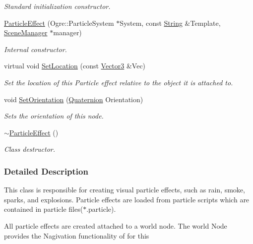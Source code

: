 \begin{DoxyCompactItemize}
\begin{DoxyCompactList}\small\item\em Standard initialization constructor. \item\end{DoxyCompactList}\item 
\hyperlink{classphys_1_1ParticleEffect_aaf5a40f8c22ca3cd01f0feeb08b8308b}{ParticleEffect} (Ogre::ParticleSystem $\ast$System, const \hyperlink{namespacephys_aa03900411993de7fbfec4789bc1d392e}{String} \&Template, \hyperlink{classphys_1_1SceneManager}{SceneManager} $\ast$manager)
\begin{DoxyCompactList}\small\item\em Internal constructor. \item\end{DoxyCompactList}\item 
virtual void \hyperlink{classphys_1_1ParticleEffect_a4371533c2d1d533208b7bc8a067a67e5}{SetLocation} (const \hyperlink{classphys_1_1Vector3}{Vector3} \&Vec)
\begin{DoxyCompactList}\small\item\em Set the location of this Particle effect relative to the object it is attached to. \item\end{DoxyCompactList}\item 
void \hyperlink{classphys_1_1ParticleEffect_aab98a28c2a7984fca81cdfee5e1d2086}{SetOrientation} (\hyperlink{classphys_1_1Quaternion}{Quaternion} Orientation)
\begin{DoxyCompactList}\small\item\em Sets the orientation of this node. \item\end{DoxyCompactList}\item 
\hypertarget{classphys_1_1ParticleEffect_a8c9c3d0cd1d02acdc626266ee485f51f}{
\hyperlink{classphys_1_1ParticleEffect_a8c9c3d0cd1d02acdc626266ee485f51f}{$\sim$ParticleEffect} ()}
\label{classphys_1_1ParticleEffect_a8c9c3d0cd1d02acdc626266ee485f51f}

\begin{DoxyCompactList}\small\item\em Class destructor. \item\end{DoxyCompactList}\end{DoxyCompactItemize}


\subsubsection{Detailed Description}
This class is responsible for creating visual particle effects, such as rain, smoke, sparks, and explosions. Particle effects are loaded from particle scripts which are contained in particle files($\ast$.particle). \par
 All particle effects are created attached to a world node. The world Node provides the Nagivation functionality of for this 

